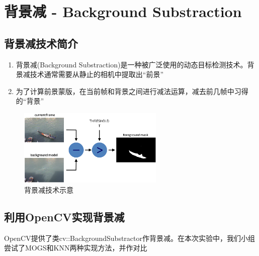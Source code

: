 \section{背景减 - Background Substraction}

\subsection{背景减技术简介}

\begin{enumerate}
    \item 背景减(Background Substraction)是一种被广泛使用的动态目标检测技术。背景减技术通常需要从静止的相机中提取出``前景''
    \item 为了计算前景蒙版，在当前帧和背景之间进行减法运算，减去前几帧中习得的``背景''
\end{enumerate}

\begin{figure}
    \includegraphics[width=0.618\textwidth]{images/Background_Subtraction_Tutorial_Scheme.png}
    \caption{背景减技术示意}
\end{figure}

\subsection{利用OpenCV实现背景减}

OpenCV提供了类cv::BackgroundSubstractor作背景减。在本次实验中，我们小组尝试了MOGS和KNN两种实现方法，并作对比